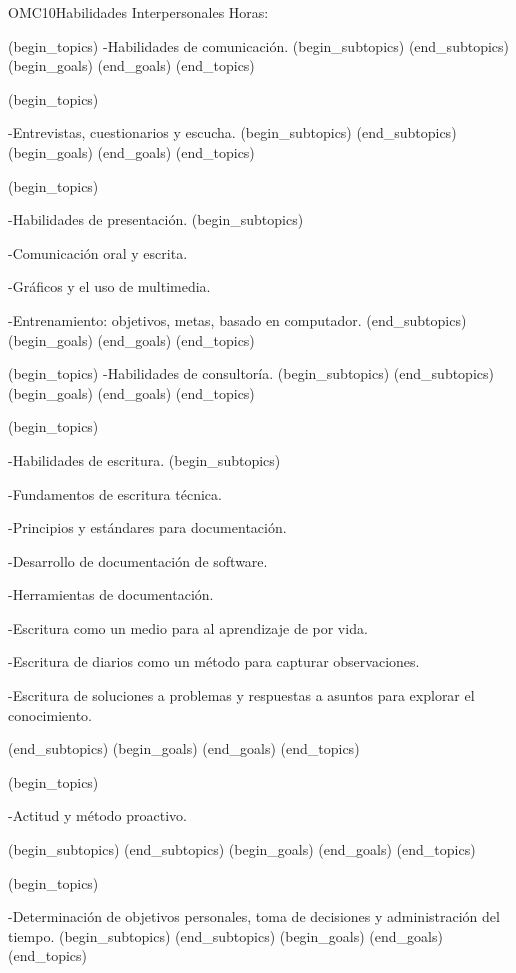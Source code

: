 \begin{BKL2}{OMC10}{Habilidades Interpersonales}
Horas:
 
(begin_topics)
-Habilidades de comunicación.
(begin_subtopics)
(end_subtopics)
(begin_goals)
(end_goals)
(end_topics)

 

(begin_topics)

-Entrevistas, cuestionarios y escucha.
(begin_subtopics)
(end_subtopics)
(begin_goals)
(end_goals)
(end_topics)

 

(begin_topics)

-Habilidades de presentación.
(begin_subtopics)

-Comunicación oral y escrita.

-Gráficos y el uso de multimedia.

-Entrenamiento: objetivos, metas, basado en computador.
(end_subtopics)
(begin_goals)
(end_goals)
(end_topics)

 

(begin_topics)
-Habilidades de consultoría.
(begin_subtopics)
(end_subtopics)
(begin_goals)
(end_goals)
(end_topics)

 

(begin_topics)

-Habilidades de escritura.
(begin_subtopics)

-Fundamentos de escritura técnica.

-Principios y estándares para documentación.

-Desarrollo de documentación de software.

-Herramientas de documentación.

-Escritura como un medio para al aprendizaje de por vida.

-Escritura de diarios como un método para capturar observaciones.

-Escritura de soluciones a problemas y respuestas a asuntos para explorar el conocimiento.

(end_subtopics)
(begin_goals)
(end_goals)
(end_topics)

 

(begin_topics)

-Actitud y método proactivo.

(begin_subtopics)
(end_subtopics)
(begin_goals)
(end_goals)
(end_topics)

 

(begin_topics)

-Determinación de objetivos personales, toma de decisiones y administración del tiempo.
(begin_subtopics)
(end_subtopics)
(begin_goals)
(end_goals)
(end_topics)


\end{BKL2}
